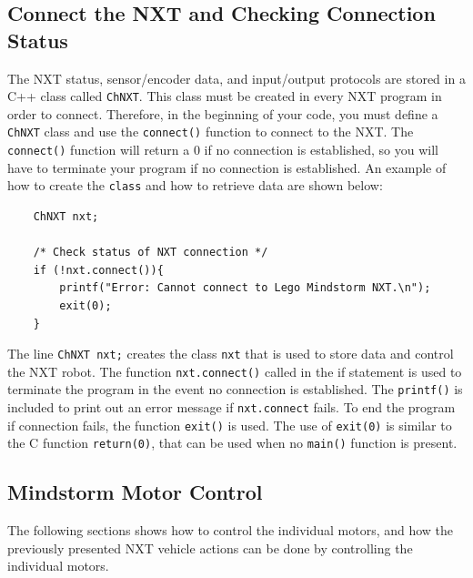 \subsection{Connect the NXT and Checking Connection Status}
The NXT status, sensor/encoder data, and input/output protocols 
are stored in a C++ class called \verb+ChNXT+. This class must be
created in every NXT program in order to connect. Therefore, in 
the beginning of your code, you must define a \verb+ChNXT+ class 
and use the \verb+connect()+ function to connect to the NXT. The 
\verb+connect()+ function will return a 0 if no connection is 
established, so you will have to terminate your program if no 
connection is established. An example of how to create the 
\verb+class+ and how to retrieve data are shown below:
\begin{verbatim}
    ChNXT nxt;

    /* Check status of NXT connection */
    if (!nxt.connect()){
        printf("Error: Cannot connect to Lego Mindstorm NXT.\n");
        exit(0);
    }
\end{verbatim}
The line \verb+ChNXT nxt;+ creates the class \verb+nxt+ that is 
used to store data and control the NXT robot. The function 
\verb+nxt.connect()+ called in the if statement is used to 
terminate the program in the event no connection is established. 
The \verb+printf()+ is included to print out an error message if 
\verb+nxt.connect+ fails. To end the program if connection fails,
the function \verb+exit()+ is used. The use of \verb+exit(0)+ is 
similar to the C function \verb+return(0)+, that can be used when
no \verb+main()+ function is present.

\subsection{Mindstorm Motor Control}
The following sections shows how to control the individual 
motors, and how the previously presented NXT vehicle actions can be done by controlling the individual motors.

